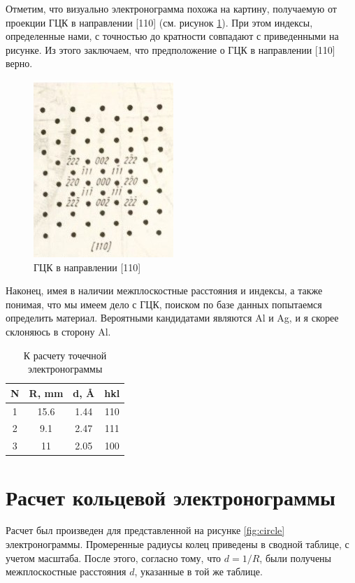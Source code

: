 \documentclass[a4paper, 12pt]{article}
\begin{document}
Отметим, что визуально электронограмма похожа на картину, получаемую от проекции ГЦК в направлении [110] (см. рисунок \ref{fig:110}). При этом индексы, определенные нами, с точностью до кратности совпадают с приведенными на рисунке. Из этого заключаем, что предположение о ГЦК в направлении [110] верно.

\begin{figure}[H]
	\centering
	\includegraphics[width=0.4\linewidth]{110}
	\caption{ГЦК в направлении [110]}
	\label{fig:110}
\end{figure}

Наконец, имея в наличии межплоскостные расстояния и индексы, а также понимая, что мы имеем дело с ГЦК, поиском по базе данных попытаемся определить материал. Вероятными кандидатами являются Al и Ag, и я скорее склоняюсь в сторону Al.

\begin{table}[H]
	\centering
	\begin{tabular}{|c|c|c|c|}
		\hline
		N & R, mm & d, \AA & hkl \\
		\hline
		1 & 15.6 & 1.44 & 110 \\
		\hline
		2 & 9.1 & 2.47 & 111 \\
		\hline
		3 & 11 & 2.05 & 100 \\
		\hline
	\end{tabular}
	\caption{К расчету точечной электронограммы}
\end{table}


\section{Расчет кольцевой электронограммы}

Расчет был произведен для представленной на рисунке \ref{fig:circle} электронограммы. Промеренные радиусы колец приведены в сводной таблице, с учетом масштаба. После этого, согласно тому, что $d = 1 / R$, были получены межплоскостные расстояния $d$, указанные в той же таблице.
\end{document}
